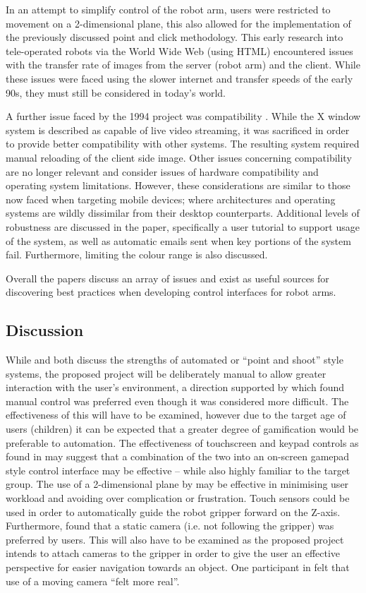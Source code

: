 \documentclass[11pt]{article} %
\begin{document}
In an attempt to simplify control of the robot arm, users were restricted to movement on a 2-dimensional plane, this also allowed for the implementation of the previously discussed point and click methodology.
This early research into tele-operated robots via the World Wide Web (using HTML) encountered issues with the transfer rate of images from the server (robot arm) and the client. While these issues were faced using the slower internet and transfer speeds of the early 90s, they must still be considered in today's world. 

A further issue faced by the 1994 project was compatibility \cite{goldberg1995desktop}. While the X window system is described as capable of live video streaming, it was sacrificed in order to provide better compatibility with other systems. The resulting system required manual reloading of the client side image. Other issues concerning compatibility are no longer relevant and consider issues of hardware compatibility and operating system limitations. However, these considerations are similar to those now faced when targeting mobile devices; where architectures and operating systems are wildly dissimilar from their desktop counterparts.
Additional levels of robustness are discussed in the paper, specifically a user tutorial to support usage of the system, as well as automatic emails sent when key portions of the system fail. Furthermore, limiting the colour range is also discussed. 

Overall the papers discuss an array of issues and exist as useful sources for discovering best practices when developing control interfaces for robot arms.

\subsection{Discussion}
While \cite{Tsui2008} and \cite{tsui2007simplifying} both discuss the strengths of automated or “point and shoot” style systems, the proposed project will be deliberately manual to allow greater interaction with the user's environment, a direction supported by \cite{tsui2007simplifying} which found manual control was preferred even though it was considered more difficult. The effectiveness of this will have to be examined, however due to the target age of users (children) it can be expected that a greater degree of gamification would be preferable to automation. The effectiveness of touchscreen and keypad controls as found in \cite{Tsui2008} may suggest that a combination of the two into an on-screen gamepad style control interface may be effective – while also highly familiar to the target group.
The use of a 2-dimensional plane by \cite{goldberg1995desktop} may be effective in minimising user workload and avoiding over complication or frustration. Touch sensors could be used in order to automatically guide the robot gripper forward on the Z-axis.
Furthermore, \cite{Tsui2008} found that a static camera (i.e. not following the gripper) was preferred by users. This will also have to be examined as the proposed project intends to attach cameras to the gripper in order to give the user an effective perspective for easier navigation towards an object. One participant in \cite{Tsui2008} felt that use of a moving camera “felt more real”.
\end{document}
